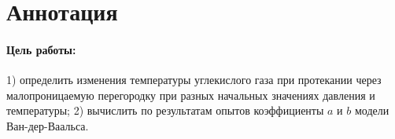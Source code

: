 \documentclass[a4paper,12pt]{report}
\begin{document}
	
	\newpage
    \pagestyle{fancy}

    \fancyhead{}
    \fancyfoot{}
    \fancyhead[L]{\rightmark}
    \fancyhead[R]{\thepage}

    \section*{Аннотация}
        \paragraph*{Цель работы:} 1) определить изменения температуры углекислого газа при протекании через малопроницаемую перегородку при разных начальных значениях давления и температуры; 2) вычислить по результатам опытов коэффициенты $a$ и $b$ модели Ван-дер-Ваальса.
\end{document}
